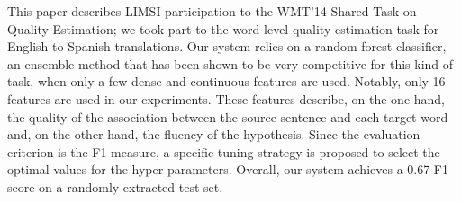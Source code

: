 This paper describes LIMSI participation to the WMT'14 Shared Task on Quality Estimation; we took part to the word-level quality estimation task for English to Spanish translations. Our system relies on a random forest classifier, an ensemble method that has been shown to be very competitive for this kind of task, when only a few dense and continuous features are used.  Notably, only 16 features are used in our experiments. These features describe, on the one hand, the quality of the association between the source sentence and each target word and, on the other hand, the fluency of the hypothesis. Since the evaluation criterion is the F1 measure, a specific tuning strategy is proposed to select the optimal values for the hyper-parameters. Overall, our system achieves a 0.67 F1 score on a randomly extracted test set.
